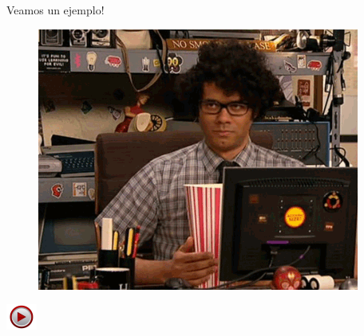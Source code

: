 \documentclass[]{beamer}
\newcommand{\video}[1]{
    \begin{center}
        \href{run:#1}{
            \includegraphics[width=1cm]{img/play.jpeg}
        }
    \end{center}
}
\begin{document}
\begin{frame}[t]{Veamos un ejemplo!}
    \begin{figure}[t]
        \centering
        \includegraphics[scale=0.5]{img/pochoclos/comiendo_2.png}
    \end{figure}
    \video{videos/seguimiento_depth.avi}
\end{frame}
\end{document}
